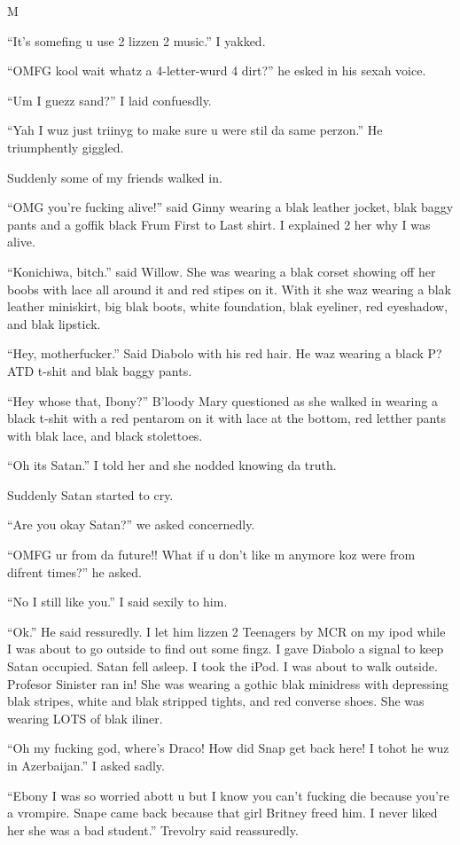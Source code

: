 M\documentclass{article}
\begin{document}
“It’s somefing u use 2 lizzen 2 music.” I yakked.

“OMFG kool wait whatz a 4-letter-wurd 4 dirt?” he esked in his sexah voice.

“Um I guezz sand?” I laid confuesdly.

“Yah I wuz just triinyg to make sure u were stil da same perzon.” He triumphently giggled.

Suddenly some of my friends walked in.

“OMG you’re fucking alive!” said Ginny wearing a blak leather jocket, blak baggy pants and a goffik black Frum First to Last shirt. I explained 2 her why I was alive.

“Konichiwa, bitch.” said Willow. She was wearing a blak corset showing off her boobs with lace all around it and red stipes on it. With it she waz wearing a blak leather miniskirt, big blak boots, white foundation, blak eyeliner, red eyeshadow, and blak lipstick.

“Hey, motherfucker.” Said Diabolo with his red hair. He waz wearing a black P?ATD t-shit and blak baggy pants.

“Hey whose that, Ibony?” B’loody Mary questioned as she walked in wearing a black t-shit with a red pentarom on it with lace at the bottom, red letther pants with blak lace, and black stolettoes.

“Oh its Satan.” I told her and she nodded knowing da truth.

Suddenly Satan started to cry.

“Are you okay Satan?” we asked concernedly.

“OMFG ur from da future!! What if u don’t like m anymore koz were from difrent times?” he asked.

“No I still like you.” I said sexily to him.

“Ok.” He said ressuredly. I let him lizzen 2 Teenagers by MCR on my ipod while I was about to go outside to find out some fingz. I gave Diabolo a signal to keep Satan occupied. Satan fell asleep. I took the iPod. I was about to walk outside. Profesor Sinister ran in! She was wearing a gothic blak minidress with depressing blak stripes, white and blak stripped tights, and red converse shoes. She was wearing LOTS of blak iliner.

“Oh my fucking god, where’s Draco! How did Snap get back here! I tohot he wuz in Azerbaijan.” I asked sadly.

“Ebony I was so worried abott u but I know you can’t fucking die because you’re a vrompire. Snape came back because that girl Britney freed him. I never liked her she was a bad student.” Trevolry said reassuredly.
\end{document}
